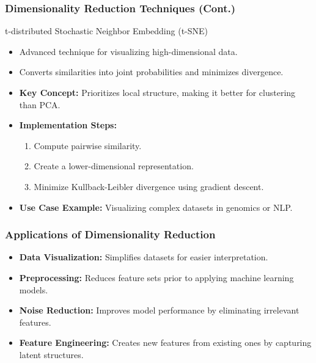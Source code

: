\documentclass[aspectratio=169]{beamer}
\begin{document}
\begin{frame}[fragile]
    \frametitle{Dimensionality Reduction Techniques (Cont.)}
    \begin{block}{t-distributed Stochastic Neighbor Embedding (t-SNE)}
        \begin{itemize}
            \item Advanced technique for visualizing high-dimensional data.
            \item Converts similarities into joint probabilities and minimizes divergence.
            \item \textbf{Key Concept:} Prioritizes local structure, making it better for clustering than PCA.
            \item \textbf{Implementation Steps:}
            \begin{enumerate}
                \item Compute pairwise similarity.
                \item Create a lower-dimensional representation.
                \item Minimize Kullback-Leibler divergence using gradient descent.
            \end{enumerate}
            \item \textbf{Use Case Example:} Visualizing complex datasets in genomics or NLP.
        \end{itemize}
    \end{block}
\end{frame}

\begin{frame}[fragile]
    \frametitle{Applications of Dimensionality Reduction}
    \begin{itemize}
        \item \textbf{Data Visualization:} Simplifies datasets for easier interpretation.
        \item \textbf{Preprocessing:} Reduces feature sets prior to applying machine learning models.
        \item \textbf{Noise Reduction:} Improves model performance by eliminating irrelevant features.
        \item \textbf{Feature Engineering:} Creates new features from existing ones by capturing latent structures.
    \end{itemize}
\end{frame}
\end{document}
